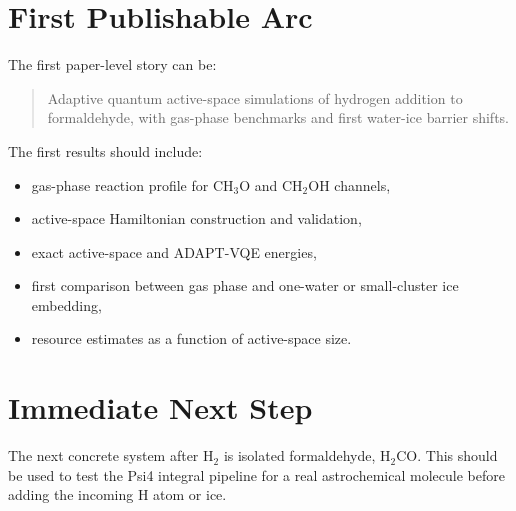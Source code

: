 \documentclass[11pt]{article}
\begin{document}
\section{First Publishable Arc}

The first paper-level story can be:
\begin{quote}
Adaptive quantum active-space simulations of hydrogen addition to formaldehyde, with gas-phase
benchmarks and first water-ice barrier shifts.
\end{quote}
The first results should include:
\begin{itemize}[leftmargin=*]
  \item gas-phase reaction profile for CH$_3$O and CH$_2$OH channels,
  \item active-space Hamiltonian construction and validation,
  \item exact active-space and ADAPT-VQE energies,
  \item first comparison between gas phase and one-water or small-cluster ice embedding,
  \item resource estimates as a function of active-space size.
\end{itemize}

\section{Immediate Next Step}

The next concrete system after H$_2$ is isolated formaldehyde, H$_2$CO. This should be used to test
the Psi4 integral pipeline for a real astrochemical molecule before adding the incoming H atom or ice.
\end{document}
